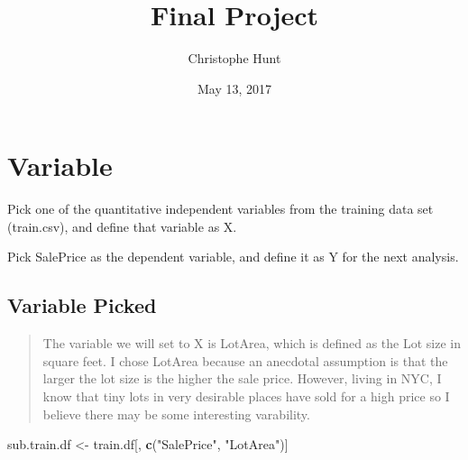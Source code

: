 \documentclass[]{article}
\title{Final Project}
\author{Christophe Hunt}
\date{May 13, 2017}
\newenvironment{Shaded}{\begin{snugshade}}{\end{snugshade}}
\newcommand{\KeywordTok}[1]{\textcolor[rgb]{0.13,0.29,0.53}{\textbf{{#1}}}}
\newcommand{\DataTypeTok}[1]{\textcolor[rgb]{0.13,0.29,0.53}{{#1}}}
\newcommand{\StringTok}[1]{\textcolor[rgb]{0.31,0.60,0.02}{{#1}}}
\newcommand{\NormalTok}[1]{{#1}}
\begin{document}
\maketitle

{
\setcounter{tocdepth}{2}
\tableofcontents
}
\section{Variable}\label{variable}

Pick one of the quantitative independent variables from the training
data set (train.csv), and define that variable as X.

Pick SalePrice as the dependent variable, and define it as Y for the
next analysis.

\subsection{Variable Picked}\label{variable-picked}

\begin{quote}
The variable we will set to X is LotArea, which is defined as the Lot
size in square feet. I chose LotArea because an anecdotal assumption is
that the larger the lot size is the higher the sale price. However,
living in NYC, I know that tiny lots in very desirable places have sold
for a high price so I believe there may be some interesting varability.
\end{quote}

\begin{Shaded}
\end{Shaded}

\begin{Shaded}
\begin{Highlighting}[]
\NormalTok{sub.train.df <-}\StringTok{ }\NormalTok{train.df[, }\KeywordTok{c}\NormalTok{(}\StringTok{"SalePrice"}\NormalTok{, }\StringTok{"LotArea"}\NormalTok{)]}
\end{Highlighting}
\end{Shaded}
\end{document}
